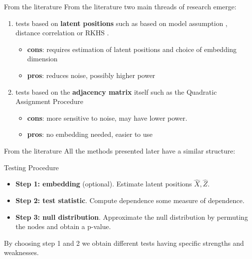 \documentclass[10.5pt]{beamer}
\begin{document}
\begin{frame}{From the literature}
From the literature two main threads of research emerge:
\begin{enumerate}
\setlength{\itemsep}{1.2em}

    \item tests based on \textbf{latent positions} such as based on model assumption \citep{fosdick_testing_2015}, distance correlation \citep{lee_network_2019} or RKHS \citep{wen_rkhs-based_2023}.
    \begin{itemize}
        \item \textbf{cons}: requires estimation of latent positions and choice of embedding dimension
        \item \textbf{pros}: reduces noise, possibly higher power
    \end{itemize}
    \pause
    \item tests based on the \textbf{adjacency matrix} itself such as the Quadratic Assignment Procedure  \citep{mantel_detection_1967, shi_asymptotic_2025}
    \begin{itemize}
        \item \textbf{cons}: more sensitive to noise, may have lower power.
        \item \textbf{pros}: no embedding needed, easier to use 
    \end{itemize}
    
\end{enumerate}

\end{frame}

\begin{frame}{From the literature}
All the methods presented later have a similar structure:
\begin{block}{Testing Procedure}
\begin{itemize}
    \item \textbf{Step 1: embedding} (optional). Estimate latent positions $\hat{X}, \hat{Z}$.
    \item \textbf{Step 2: test statistic}. Compute dependence some measure of dependence.
    \item \textbf{Step 3: null distribution}. Approximate the null distribution by permuting the nodes and obtain a p-value.
\end{itemize}
\end{block}
By choosing step 1 and 2 we obtain different tests having specific strengths and weaknesses.
\end{frame}
\end{document}
